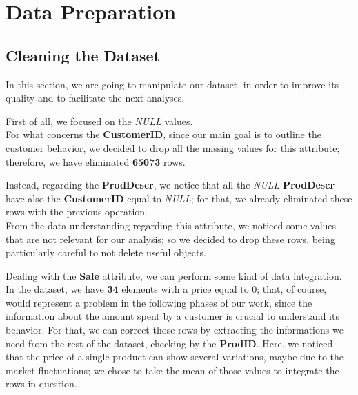 \section{Data Preparation}

\subsection{Cleaning the Dataset}
In this section, we are going to manipulate our dataset, in order to improve its quality and to facilitate the next analyses.

First of all, we focused on the \emph{NULL} values.\\
For what concerns the \textbf{CustomerID}, since our main goal is to outline the customer behavior, we decided to drop all the missing values for this attribute; therefore, we have eliminated \textbf{65073} rows.

Instead, regarding the \textbf{ProdDescr}, we notice that all the \emph{NULL} \textbf{ProdDescr} have also the \textbf{CustomerID} equal to \emph{NULL}; for that, we already eliminated these rows with the previous operation.\\ 
From the data understanding regarding this attribute, we noticed some values that are not relevant for our analysis; so we decided to drop these rows, being particularly careful to not delete useful objects.

Dealing with the \textbf{Sale} attribute, we can perform some kind of data integration.\\
In the dataset, we have \textbf{34} elements with a price equal to 0; that, of course, would represent a problem in the following phases of our work, since the information about the amount spent by a customer is crucial to understand its behavior. For that, we can correct those rows by extracting the informations we need from the rest of the dataset, checking by the \textbf{ProdID}. Here, we noticed that the price of a single product can show several variations, maybe due to the market fluctuations; we chose to take the mean of those values to integrate the rows in question.

